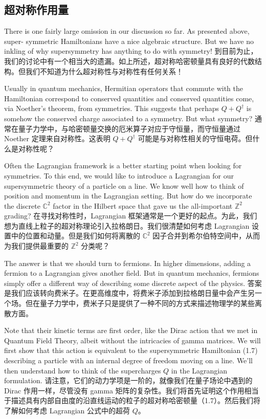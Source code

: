\documentclass{article}
\begin{document}
\begin{paracol}{2}
\subsection*{超对称作用量}
\switchcolumn*

There is one fairly large omission in our discussion so far. As presented above, super- symmetric Hamiltonians have a nice algebraic structure. But we have no inkling of why supersymmetry has anything to do with symmetry!
\switchcolumn
到目前为止，我们的讨论中有一个相当大的遗漏。如上所述，超对称哈密顿量具有良好的代数结构。但我们不知道为什么超对称性与对称性有任何关系！
\switchcolumn*

Usually in quantum mechanics, Hermitian operators that commute with the Hamiltonian correspond to conserved quantities and conserved quantities come, via Noether's theorem, from symmetries. This suggests that perhaps $Q + Q^{\dagger}$ is somehow the conserved charge associated to a symmetry. But what symmetry?
\switchcolumn
通常在量子力学中，与哈密顿量交换的厄米算子对应于守恒量，而守恒量通过 Noether 定理来自对称性。这表明 $Q + Q^{\dagger}$ 可能是与对称性相关的守恒电荷。但什么是对称性呢？
\switchcolumn*

Often the Lagrangian framework is a better starting point when looking for symmetries. To this end, we would like to introduce a Lagrangian for our supersymmetric theory of a particle on a line. We know well how to think of position and momentum in the Lagrangian setting. But how do we incorporate the discrete $\mathbb{C}^2$ factor in the Hilbert space that gave us the all-important $\mathbb{Z}^2$ grading?
\switchcolumn
在寻找对称性时，Lagrangian 框架通常是一个更好的起点。为此，我们想为直线上粒子的超对称理论引入拉格朗日。我们很清楚如何考虑 Lagrangian 设置中的位置和动量。但是我们如何将离散的 $\mathbb{C}^2$ 因子合并到希尔伯特空间中，从而为我们提供最重要的 $\mathbb{Z}^2$ 分类呢？
\switchcolumn*

The answer is that we should turn to fermions. In higher dimensions, adding a fermion to a Lagrangian gives another field. But in quantum mechanics, fermions simply offer a different way of describing some discrete aspect of the physics.
\switchcolumn
答案是我们应该转向费米子。在更高维度中，将费米子添加到拉格朗日量中会产生另一个场。但在量子力学中，费米子只是提供了一种不同的方式来描述物理学的某些离散方面。
\switchcolumn*

Note that their kinetic terms are first order, like the Dirac action that we met in Quantum Field Theory, albeit without the intricacies of gamma matrices. We will first show that this action is equivalent to the supersymmetric Hamiltonian (1.7) describing a particle with an internal degree of freedom moving on a line. We'll then understand how to think of the supercharges $Q$ in the Lagrangian formulation.
\switchcolumn
请注意，它们的动力学项是一阶的，就像我们在量子场论中遇到的 Dirac 作用一样，尽管没有 gamma 矩阵的复杂性。我们将首先证明这个作用相当于描述具有内部自由度的沿直线运动的粒子的超对称哈密顿量（1.7）。然后我们将了解如何考虑 Lagrangian 公式中的超荷 $Q$。
\switchcolumn*


\end{paracol}
\end{document}
